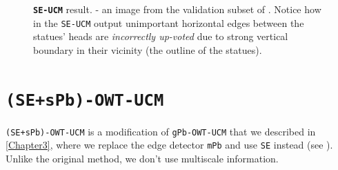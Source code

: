 \begin{figure}[ht!]
\centering
{}
\caption[{\tt SE-UCM} drawback - ``bleeding'' of strong edges towards unimportant ones]{\textbf{\texttt{SE-UCM}} result. \protect{} - an image from the validation subset of \cite{BSDS500resources}. Notice how in the {\tt SE-UCM} output \protect{} unimportant horizontal edges between the statues' heads are {\it incorrectly %
up-voted} due to strong vertical boundary in their vicinity (the outline of the statues).}
\label{fig:SE-UCM-tikis-bleeding}
\end{figure}

\section{{\tt (SE+sPb)-OWT-UCM}}
\label{sec:ch5-SE_sPb-OWT-UCM}
{\tt (SE+sPb)-OWT-UCM} is a modification of {\tt gPb-OWT-UCM} that we described in \cref{Chapter3}, where we replace the edge detector {\tt mPb} and use {\tt SE} instead (see ). Unlike the original method, we don't use multiscale information.

